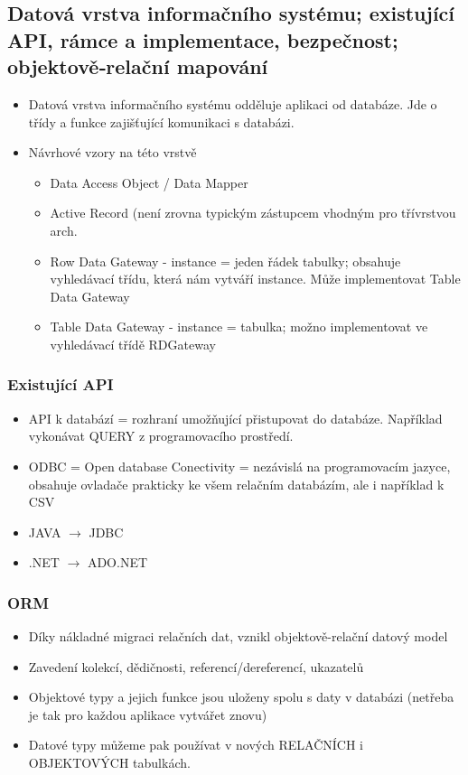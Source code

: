 \documentclass[10pt,a4paper]{article}
\begin{document}
\subsection{Datová vrstva informačního systému; existující API, rámce a implementace, bezpečnost; objektově‐relační mapování}
\begin{itemize}
\item Datová vrstva informačního systému odděluje aplikaci od databáze. Jde o třídy a funkce zajišťující komunikaci s databázi.
\item Návrhové vzory na této vrstvě
\begin{itemize}
\item Data Access Object / Data Mapper
\item Active Record (není zrovna typickým zástupcem vhodným pro třívrstvou arch.
\item Row Data Gateway - instance = jeden řádek tabulky; obsahuje vyhledávací třídu, která nám vytváří instance. Může implementovat Table Data Gateway
\item Table Data Gateway - instance = tabulka; možno implementovat ve vyhledávací třídě RDGateway
\end{itemize}
\end{itemize}
\subsubsection{Existující API}
\begin{itemize}
\item API k databází = rozhraní umožňující přistupovat do databáze. Například vykonávat QUERY z programovacího prostředí.
\item ODBC = Open database Conectivity = nezávislá na programovacím jazyce, obsahuje ovladače prakticky ke všem relačním databázím, ale i například k CSV
\item JAVA $\rightarrow$ JDBC
\item .NET $\rightarrow$ ADO.NET
\end{itemize}
\subsubsection{ORM}
\begin{itemize}
\item Díky nákladné migraci relačních dat, vznikl objektově-relační datový model
\item Zavedení kolekcí, dědičnosti, referencí/dereferencí, ukazatelů
\item Objektové typy a jejich funkce jsou uloženy spolu s daty v databázi (netřeba je tak pro každou aplikace vytvářet znovu)
\item Datové typy můžeme pak používat v nových RELAČNÍCH i OBJEKTOVÝCH tabulkách.
\end{itemize}
\end{document}
